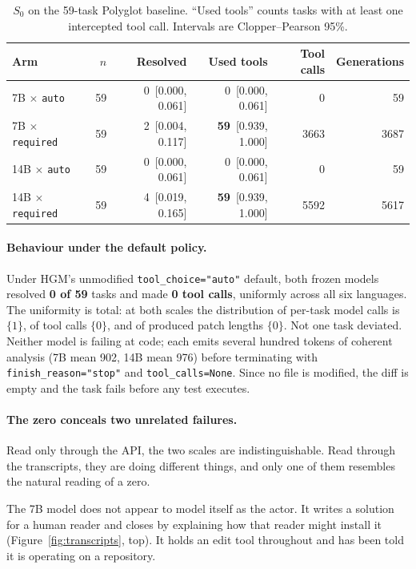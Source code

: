 \documentclass{article}
\newcommand{\Sz}{\ensuremath{S_0}}
\begin{document}
\begin{table}[t]
\caption{\Sz{} on the 59-task Polyglot baseline. ``Used tools'' counts tasks
with at least one intercepted tool call. Intervals are Clopper--Pearson 95\%.}
\label{tab:main}
\centering
\small
\begin{tabular}{lrrrrr}
\toprule
Arm & $n$ & Resolved & Used tools & Tool calls & Generations \\
\midrule
7B $\times$ \texttt{auto}      & 59 & 0 \,[0.000, 0.061] & 0 \,[0.000, 0.061] & 0 & 59 \\
7B $\times$ \texttt{required}  & 59 & 2 \,[0.004, 0.117] & \textbf{59} \,[0.939, 1.000] & 3663 & 3687 \\
14B $\times$ \texttt{auto}     & 59 & 0 \,[0.000, 0.061] & 0 \,[0.000, 0.061] & 0 & 59 \\
14B $\times$ \texttt{required} & 59 & 4 \,[0.019, 0.165] & \textbf{59} \,[0.939, 1.000] & 5592 & 5617 \\
\bottomrule
\end{tabular}
\end{table}

\paragraph{Behaviour under the default policy.}
Under HGM's unmodified \texttt{tool\_choice="auto"} default, both frozen models
resolved \textbf{0 of 59} tasks and made \textbf{0 tool calls}, uniformly across
all six languages. The uniformity is total: at both scales the distribution of
per-task model calls is $\{1\}$, of tool calls $\{0\}$, and of produced patch
lengths $\{0\}$. Not one task deviated. Neither model is failing at code; each
emits several hundred tokens of coherent analysis (7B mean 902, 14B mean 976)
before terminating with \texttt{finish\_reason="stop"} and
\texttt{tool\_calls=None}. Since no file is modified, the diff is empty and the
task fails before any test executes.

\paragraph{The zero conceals two unrelated failures.}
Read only through the API, the two scales are indistinguishable. Read through
the transcripts, they are doing different things, and only one of them
resembles the natural reading of a zero.

The 7B model does not appear to model itself as the actor. It writes a
solution for a human reader and closes by explaining how that reader might
install it (Figure~\ref{fig:transcripts}, top). It holds an edit tool
throughout and has been told it is operating on a repository.
\end{document}
